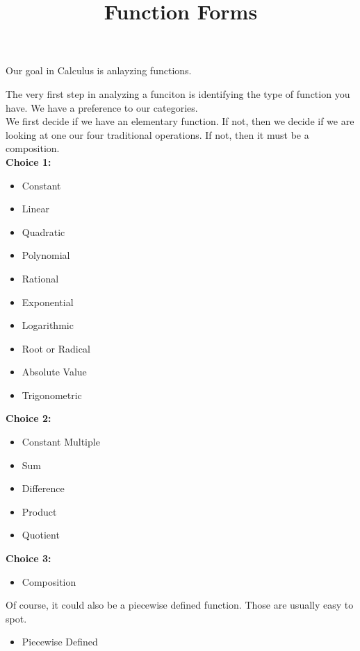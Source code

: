 \documentclass{ximera}
\title{Function Forms}
\begin{document}
\begin{abstract}
%
\end{abstract}
\maketitle



Our goal in Calculus is anlayzing functions.

The very first step in analyzing a funciton is identifying the type of function you have. We have a preference to our categories. \\

We first decide if we have an elementary function. If not, then we decide if we are looking at one our four traditional operations.  If not, then it must be a composition.\\



\textbf{\textcolor{blue!55!black}{Choice 1:}}
\begin{itemize}
\item Constant
\item Linear
\item Quadratic
\item Polynomial
\item Rational
\item Exponential
\item Logarithmic
\item Root or Radical
\item Absolute Value
\item Trigonometric
\end{itemize}



\textbf{\textcolor{blue!55!black}{Choice 2:}}
\begin{itemize}
\item Constant Multiple
\item Sum
\item Difference
\item Product
\item Quotient
\end{itemize}



\textbf{\textcolor{blue!55!black}{Choice 3:}}
\begin{itemize}
\item Composition
\end{itemize}




Of course, it could also be a piecewise defined function.  Those are usually easy to spot.
\begin{itemize}
\item Piecewise Defined
\end{itemize}
\end{document}
